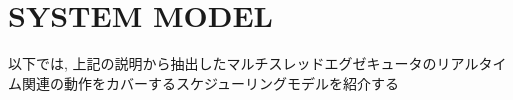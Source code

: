 
\section{SYSTEM MODEL}
\label{sec: system_model}


\begin{frame}{}
    以下では, 上記の説明から抽出したマルチスレッドエグゼキュータのリアルタイム関連の動作をカバーするスケジューリングモデルを紹介する
\end{frame}

\begin{frame}{}
\end{frame}

